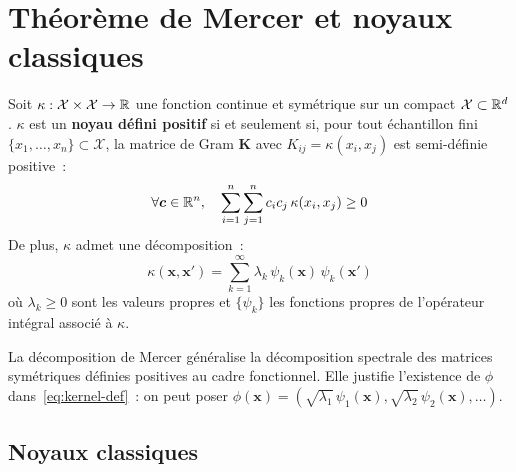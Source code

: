 \section{Th\'eor\`eme de Mercer et noyaux classiques}
\label{sec:mercer}

\begin{theoreme}[Mercer]
\label{thm:mercer}
Soit $\kappa : \mathcal{X} \times \mathcal{X} \to \mathbb{R}$ une fonction continue
et sym\'etrique sur un compact $\mathcal{X} \subset \mathbb{R}^d$.
$\kappa$ est un \textbf{noyau d\'efini positif} si et seulement si,
pour tout \'echantillon fini $\{x_1, \ldots, x_n\} \subset \mathcal{X}$,
la matrice de Gram $\bm{K}$ avec $K_{ij} = \kappa(x_i, x_j)$ est
semi-d\'efinie positive~:
\begin{equation}
  \forall \bm{c} \in \mathbb{R}^n, \quad
  \sum_{i=1}^n \sum_{j=1}^n c_i c_j\, \kappa(x_i, x_j) \geq 0
\end{equation}
De plus, $\kappa$ admet une d\'ecomposition~:
\begin{equation}
  \kappa(\bm{x}, \bm{x}') = \sum_{k=1}^{\infty} \lambda_k\,
  \psi_k(\bm{x})\, \psi_k(\bm{x}')
  \label{eq:mercer-decomp}
\end{equation}
o\`u $\lambda_k \geq 0$ sont les valeurs propres et $\{\psi_k\}$ les
fonctions propres de l'op\'erateur int\'egral associ\'e \`a $\kappa$.
\end{theoreme}

\begin{remarque}
La d\'ecomposition de Mercer g\'en\'eralise la d\'ecomposition spectrale
des matrices sym\'etriques d\'efinies positives au cadre fonctionnel.
Elle justifie l'existence de $\phi$ dans~\eqref{eq:kernel-def}~:
on peut poser $\phi(\bm{x}) = (\sqrt{\lambda_1}\,\psi_1(\bm{x}),
\sqrt{\lambda_2}\,\psi_2(\bm{x}), \ldots)$.
\end{remarque}

\subsection{Noyaux classiques}

